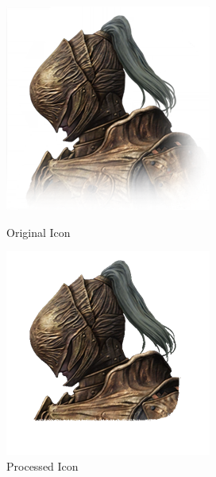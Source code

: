 \begin{figure}[htbp]
    \centering
    \begin{minipage}{0.35\textwidth}
        \centering
        \includegraphics[width=\textwidth]{ressources/icon_4_original.png}
        \caption{Original Icon}
        \label{fig:original_icon}
    \end{minipage}
    \hfill
    \begin{minipage}{0.35\textwidth}
        \centering
        \includegraphics[width=\textwidth]{ressources/icon_4.png}
        \caption{Processed Icon}
        \label{fig:processed_icon}
    \end{minipage}
\end{figure}
